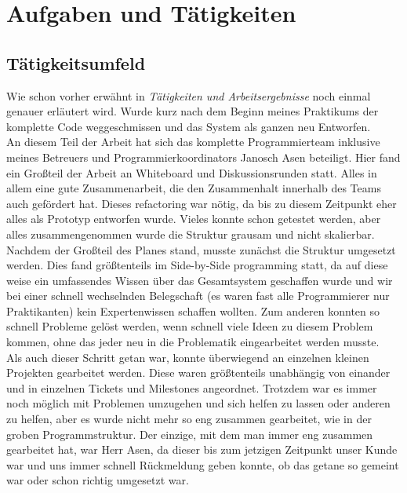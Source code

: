 \section{Aufgaben und Tätigkeiten}

\subsection{Tätigkeitsumfeld}

Wie schon vorher erwähnt in \emph{Tätigkeiten und Arbeitsergebnisse} noch einmal genauer erläutert wird. Wurde kurz nach dem Beginn meines Praktikums der komplette Code weggeschmissen und das System als ganzen neu Entworfen.\\
An diesem Teil der Arbeit hat sich das komplette Programmierteam inklusive meines Betreuers und Programmierkoordinators Janosch Asen beteiligt. Hier fand ein Großteil der Arbeit an Whiteboard und Diskussionsrunden statt. Alles in allem eine gute Zusammenarbeit, die den Zusammenhalt innerhalb des Teams auch gefördert hat. Dieses refactoring war nötig, da bis zu diesem Zeitpunkt eher alles als Prototyp entworfen wurde. Vieles konnte schon getestet werden, aber alles zusammengenommen wurde die Struktur grausam und nicht skalierbar.\\

Nachdem der Großteil des Planes stand, musste zunächst die Struktur umgesetzt werden. Dies fand größtenteils im Side-by-Side programming statt, da auf diese weise ein umfassendes Wissen über das Gesamtsystem geschaffen wurde und wir bei einer schnell wechselnden Belegschaft (es waren fast alle Programmierer nur Praktikanten) kein Expertenwissen schaffen wollten. Zum anderen konnten so schnell Probleme gelöst werden, wenn schnell viele Ideen zu diesem Problem kommen, ohne das jeder neu in die Problematik eingearbeitet werden musste.\\


Als auch dieser Schritt getan war, konnte überwiegend an einzelnen kleinen Projekten gearbeitet werden. Diese waren größtenteils unabhängig von einander und in einzelnen Tickets und Milestones angeordnet. Trotzdem war es immer noch möglich mit Problemen umzugehen und sich helfen zu lassen oder anderen zu helfen, aber es wurde nicht mehr so eng zusammen gearbeitet, wie in der groben Programmstruktur. Der einzige, mit dem man immer eng zusammen gearbeitet hat, war Herr Asen, da dieser bis zum jetzigen Zeitpunkt unser Kunde war und uns immer schnell Rückmeldung geben konnte, ob das getane so gemeint war oder schon richtig umgesetzt war.


